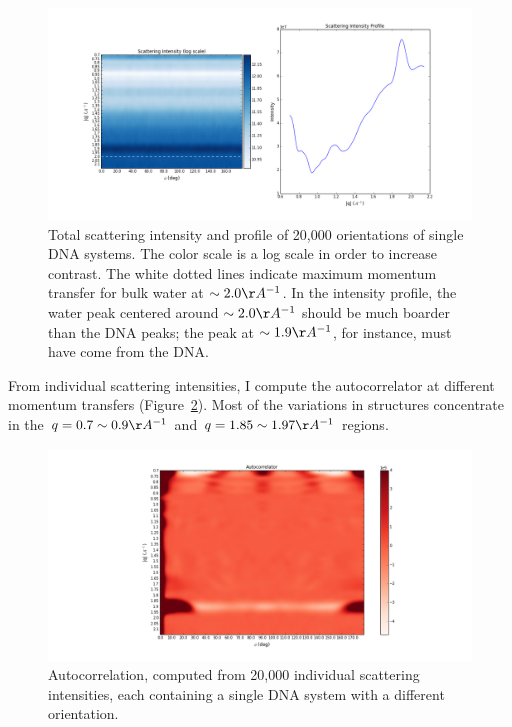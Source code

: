 \documentclass[12pt]{article}
\begin{document}
\begin{figure}[h!]
\center
\includegraphics[width=1.1\textwidth]{figures/Iscat.png}
\caption{Total scattering intensity and profile of 20,000 orientations of single DNA systems. The color scale is a log scale in order to increase contrast. The white dotted lines indicate maximum momentum transfer for bulk water at $\sim 2.0 \AA^{-1}$. In the intensity profile, the water peak centered around $\sim 2.0 \AA^{-1}$ should be much boarder than the DNA peaks; the peak at $\sim 1.9 \AA^{-1}$, for instance, must have come from the DNA.}
\label{fig:scatter}
\end{figure}

From individual scattering intensities, I compute the autocorrelator at different momentum transfers (Figure~\ref{fig:autocorr}). Most of the variations in structures concentrate in the $q = 0.7 \sim 0.9 \AA^{-1}$ and $q = 1.85  \sim 1.97 \AA^{-1}$ regions. 

\begin{figure}[h!]
\center
\includegraphics[width=1.1\textwidth]{figures/autocorr.png}
\caption{Autocorrelation, computed from 20,000 individual scattering intensities, each containing a single DNA system with a different orientation. }
\label{fig:autocorr}
\end{figure}
\end{document}
